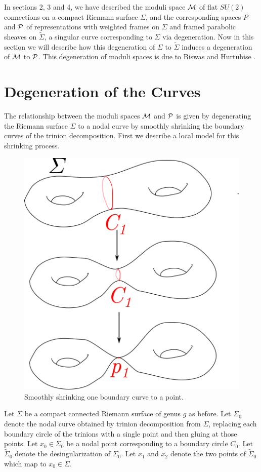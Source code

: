 
	In sections 2, 3 and 4, we have described the moduli space $\mathcal{M}$ of flat $SU(2)$ connections on a compact Riemann surface $\Sigma$, and the corresponding spaces $P$ and $\mathcal{P}$ of representations with weighted frames on $\Sigma$ and framed parabolic sheaves on $\tilde{\Sigma}$, a singular curve corresponding to $\Sigma$ via degeneration. Now in this section we will describe how this degeneration of $\Sigma$ to $\tilde{\Sigma}$ induces a degeneration of $\mathcal{M}$ to $\mathcal{P}$. This degeneration of moduli spaces is due to Biswas and Hurtubise \cite{biswas_degenerations_2021}. 
\section{Degeneration of the Curves}
	The relationship between the moduli spaces $\mathcal{M}$ and $\mathcal{P}$ is given by degenerating the Riemann surface $\Sigma$ to a nodal curve by smoothly shrinking the boundary curves of the trinion decomposition. First we describe a local model for this shrinking process.
	
	\begin{figure}[h]
		\centering
		\includegraphics[width=0.6\linewidth]{degen1pt}
		\caption{Smoothly shrinking one boundary curve to a point.}
		\label{fig:degen}
	\end{figure}
	
	Let $\Sigma$ be a compact connected Riemann surface of genus $g$ as before. Let $\Sigma_0$ denote the nodal curve obtained by trinion decomposition from $\Sigma$, replacing each boundary circle of the trinions with a single point and then gluing at those points. Let $x_0 \in \Sigma_0$ be a nodal point corresponding to a boundary circle $C_0$. Let $\tilde{\Sigma}_0$ denote the desingularization of $\Sigma_0$. Let $x_1$ and $x_2$ denote the two points of $\tilde{\Sigma}_0$ which map to $x_0 \in \Sigma$. 
	
